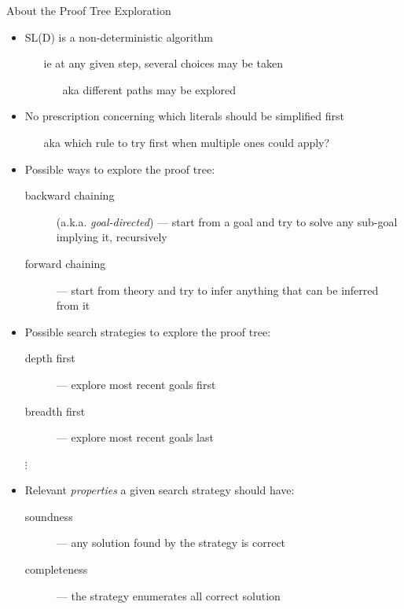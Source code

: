 \documentclass[presentation]{beamer}\mode<presentation>{\usetheme{AMSBolognaFC}}
\begin{document}
\begin{frame}[allowframebreaks]{About the Proof Tree Exploration}
    \begin{itemize}
        \item SL(D) is a \alert{non-deterministic} algorithm
        \begin{itemize}
            \item[ie] at any given step, several choices may be taken 
            \begin{itemize}
                \item[aka] different paths may be explored
            \end{itemize} 
        \end{itemize}

        \bigskip

        \item No prescription concerning which literals should be simplified first  
        \begin{itemize}
            \item[aka] which rule to try first when multiple ones could apply?
        \end{itemize}

        \bigskip

        \item Possible ways to explore the proof tree:
        \begin{description}
            \item[backward chaining] (a.k.a. \emph{goal-directed}) --- start from a goal and try to solve any sub-goal implying it, recursively
            \item[forward chaining] --- start from theory and try to infer anything that can be inferred from it
        \end{description}

        \framebreak

        \item Possible search strategies to explore the proof tree:
        \begin{description}
            \item[depth first] --- explore most recent goals \alert{first}
            \item[breadth first] --- explore most recent goals \alert{last} 
            \item[$\vdots$] 
        \end{description}

        \bigskip

        \item Relevant \emph{properties} a given search strategy should have: 
        \begin{description}
            \item[soundness] --- \alert{any} solution found by the strategy is \alert{correct}
            \item[completeness] --- the strategy enumerates \alert{all} correct solution
        \end{description}
    \end{itemize}
\end{frame}
\end{document}
